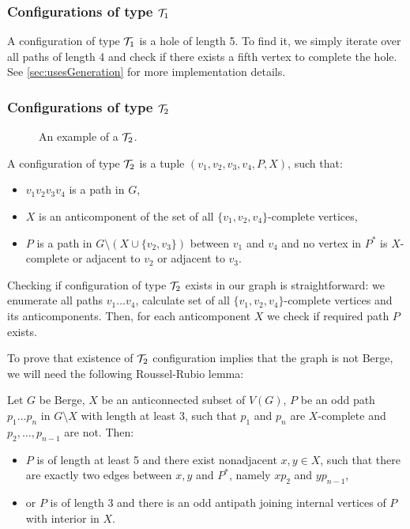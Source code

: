 \subsubsection{Configurations of type $\mathcal{T}_1$}

A configuration of type $\mathcal{T}_1$ is a hole of length 5. To find it, we simply iterate over all paths of length 4 and check if there exists a fifth vertex to complete the hole. See \cref{sec:usesGeneration} for more implementation details.

\subsubsection{Configurations of type $\mathcal{T}_2$}

\begin{wrapfigure}{r}{0.35\textwidth}
	
	\caption{An example of a $\mathcal{T}_2$.}%
	\vspace{-1.5cm}
\end{wrapfigure}

A configuration of type $\mathcal{T}_2$ is a tuple $(v_1, v_2, v_3, v_4, P, X)$, such that:
\begin{itemize}
	\item $v_1v_2v_3v_4$ is a path in $G$,
	\item $X$ is an anticomponent of the set of all $\{v_1, v_2, v_4\}$-complete vertices,
	\item $P$ is a path in $G\setminus(X \cup \{v_2, v_3\})$ between $v_1$ and $v_4$ and no vertex in $P^*$ is $X$-complete or adjacent to $v_2$ or adjacent to $v_3$.
\end{itemize}

Checking if configuration of type $\mathcal{T}_2$ exists in our graph is straightforward: we enumerate all paths $v_1\ldots v_4$, calculate set of all $\{v_1, v_2, v_4\}$-complete vertices and its anticomponents. Then, for each anticomponent $X$ we check if required path $P$ exists.

To prove that existence of $\mathcal{T}_2$ configuration implies that the graph is not Berge, we will need the following Roussel-Rubio lemma:

\begin{lemma}\label{lem:Roussel-Rubio}
	Let $G$ be Berge, $X$ be an anticonnected subset of $V(G)$, $P$ be an odd path $p_1\ldots p_n$ in $G\setminus X$ with length at least 3, such that $p_1$ and $p_n$ are $X$-complete and $p_2, \ldots, p_{n-1}$ are not. Then:
	\begin{itemize}
		\item $P$ is of length at least 5 and there exist nonadjacent $x, y \in X$, such that there are exactly two edges between $x, y$ and $P^*$, namely $xp_2$ and $yp_{n-1}$,
		\item or $P$ is of length 3 and there is an odd antipath joining internal vertices of $P$ with interior in $X$.
	\end{itemize}
\end{lemma}

